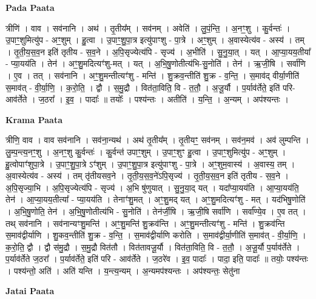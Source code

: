 \documentclass[17pt]{extarticle}
\begin{document}
\textbf{Pada Paata} \newline

त्रीणि॑ । वाव । सव॑नानि । अथ॑ । तृ॒तीय᳚म् । सव॑नम् । अवेति॑ । लु॒पं॒न्ति॒ । अ॒नꣳ॒॒शु । कु॒र्वन्तः॑ । उ॒पाꣳ॒॒शुमित्यु॑प - अꣳ॒॒शुम् । हु॒त्वा । उ॒पाꣳ॒॒शु॒पा॒त्र इत्यु॑पाꣳशु - पा॒त्रे । अꣳ॒॒शुम् । अ॒वास्येत्य॑व - अस्य॑ । तम् । तृ॒ती॒य॒स॒व॒न इति॑ तृतीय - स॒व॒ने । अ॒पि॒सृज्येत्य॑पि - सृज्य॑ । अ॒भीति॑ । सु॒नु॒या॒त् । यत् । आ॒प्या॒यय॒तीया᳚ - प्या॒यय॑ति । तेन॑ । अꣳ॒॒शु॒मदित्यꣳ॑शु-मत् । यत् । अ॒भि॒षु॒णोतीत्य॑भि-सु॒नोति॑ । तेन॑ । ऋ॒जी॒षि । सर्वा॑णि । ए॒व । तत् । सव॑नानि । अꣳ॒॒शु॒मन्तीत्यꣳ॑शु - मन्ति॑ । शु॒क्रव॒न्तीति॑ शु॒क्र - व॒न्ति॒ । स॒माव॑द् वीर्या॒णीति॑ स॒माव॑त् - वी॒र्या॒णि॒ । क॒रो॒ति॒ । द्वौ । स॒मु॒द्रौ । वित॑ता॒विति॒ वि - त॒तौ॒ । अ॒जू॒र्यौ । प॒र्याव॑र्तेते॒ इति॑ परि-आव॑र्तेते । ज॒ठरा᳚ । इ॒व॒ । पादाः᳚ ॥ तयोः᳚ । पश्य॑न्तः । अतीति॑ । य॒न्ति॒ । अ॒न्यम् । अप॑श्यन्तः ।  \newline


\textbf{Krama Paata} \newline

त्रीणि॒ वाव । वाव सव॑नानि । सव॑ना॒न्यथ॑ । अथ॑ तृ॒तीय᳚म् । तृ॒तीयꣳ॒॒ सव॑नम् । सव॑न॒मव॑ । अव॑ लुम्पन्ति । लु॒म्प॒न्त्य॒नꣳ॒॒शु । अ॒नꣳ॒॒शु कु॒र्वन्तः॑ । कु॒र्वन्त॑ उपाꣳ॒॒शुम् । उ॒पाꣳ॒॒शुꣳ हु॒त्वा । उ॒पाꣳ॒॒शुमित्यु॑प - अꣳ॒॒शुम् । हु॒त्वोपाꣳ॑शुपा॒त्रे । उ॒पाꣳ॒॒शु॒पा॒त्रे ऽꣳ॑शुम् । उ॒पाꣳ॒॒शु॒पा॒त्र इत्यु॑पाꣳशु - पा॒त्रे । अꣳ॒॒शुम॒वास्य॑ । अ॒वास्य॒ तम् । अ॒वास्येत्य॑व - अस्य॑ । तम् तृ॑तीयसव॒ने । तृ॒ती॒य॒स॒व॒ने॑ऽपि॒सृज्य॑ । तृ॒ती॒य॒स॒व॒न इति॑ तृतीय - स॒व॒ने । अ॒पि॒सृज्या॒भि । अ॒पि॒सृज्येत्य॑पि - सृज्य॑ । अ॒भि षु॑णुयात् । सु॒नु॒या॒द् यत् । 
यदा᳚प्या॒यय॑ति । आ॒प्या॒यय॑ति॒ तेन॑ । आ॒प्या॒यय॒तीत्या᳚ - प्या॒यय॑ति । तेनाꣳ॑शु॒मत् । अꣳ॒॒शु॒मद् यत् । अꣳ॒॒शु॒मदित्यꣳ॑शु - मत् । यद॑भिषु॒णोति॑ । अ॒भि॒षु॒णोति॒ तेन॑ । अ॒भि॒॒षु॒णोतीत्य॑भि - सु॒नोति॑ । तेन॑र्जी॒षि । ऋ॒जी॒षि सर्वा॑णि । सर्वा᳚ण्ये॒व । ए॒व तत् । तथ् सव॑नानि । सव॑नान्यꣳशु॒मन्ति॑ । अꣳ॒॒शु॒मन्ति॑ शु॒क्रव॑न्ति । अꣳ॒॒शु॒मन्तीत्यꣳ॑शु - मन्ति॑ । शु॒क्रव॑न्ति स॒माव॑द्वीर्याणि । शु॒कव॒न्तीति॑ शु॒क्र - व॒न्ति॒ । स॒माव॑द्वीर्याणि करोति । स॒माव॑द्वीर्या॒णीति॑ स॒माव॑त् - वी॒र्या॒णि॒ । क॒रो॒ति॒ द्वौ । द्वौ स॑मु॒द्रौ । स॒मु॒द्रौ वित॑तौ । वित॑तावजू॒र्यौ । वित॑ता॒विति॒ वि - त॒तौ॒ । अ॒जू॒र्यौ प॒र्याव॑र्तेते । प॒र्याव॑र्तेते ज॒ठरा᳚ । प॒र्याव॑र्तेते॒ इति॑ परि - आव॑र्तेते । ज॒ठरे॑व । इ॒व॒ पादाः᳚ । पादा॒ इति॒ पादाः᳚ ॥ तयोः॒ पश्य॑न्तः । पश्य॑न्तो॒ अति॑ । अति॑ यन्ति । य॒न्त्य॒न्यम् । अ॒न्यमप॑श्यन्तः । अप॑श्यन्तः॒ सेतु॑ना \newline

\textbf{Jatai Paata} \newline
\end{document}
